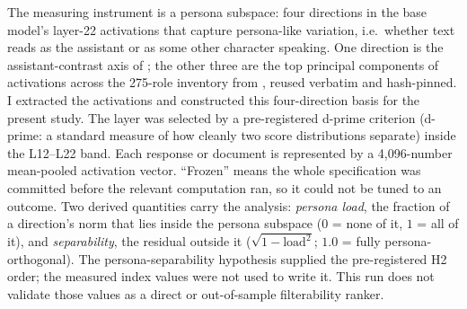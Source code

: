 The measuring instrument is a persona subspace: four directions in the
base model's layer-22 activations that capture persona-like variation,
i.e.\ whether text reads as the assistant or as some other character
speaking. One direction is the assistant-contrast axis of
\citet{lu2026assistant}; the other three are the top principal components
of activations across the 275-role inventory from
\citet{song2026role}, reused verbatim and hash-pinned. I extracted the
activations and constructed this four-direction basis for the present study.
The layer was selected by a pre-registered d-prime criterion
(d-prime: a standard measure of how cleanly two score distributions
separate) inside the L12--L22 band. Each response or document is represented
by a 4,096-number mean-pooled
activation vector. ``Frozen'' means the whole specification was committed
before the relevant computation ran, so it could not be tuned to an
outcome. Two derived quantities carry the analysis:
\emph{persona load}, the fraction of a direction's norm that lies inside
the persona subspace ($0$ = none of it, $1$ = all of it), and
\emph{separability}, the residual outside it
($\sqrt{1 - \mathrm{load}^2}$; $1.0$ = fully persona-orthogonal). The
persona-separability hypothesis supplied the pre-registered H2 order; the
measured index values were not used to write it. This run does not validate
those values as a direct or out-of-sample filterability ranker.
